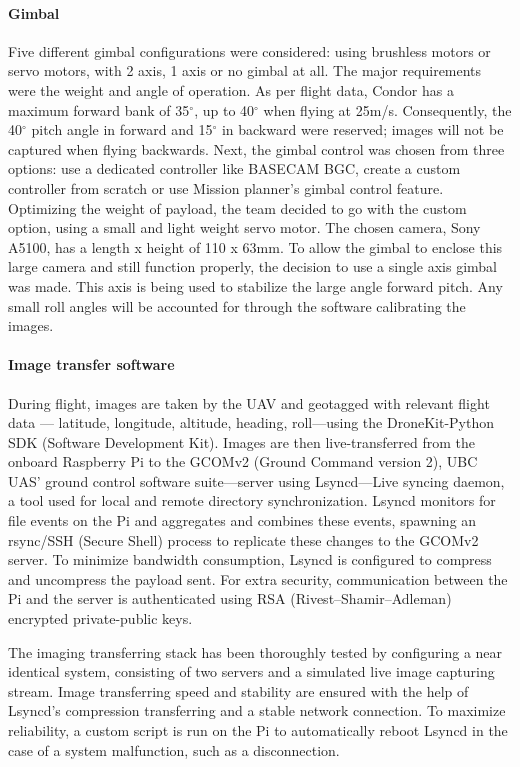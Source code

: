 \paragraph{Gimbal} 
Five different gimbal configurations were considered: using brushless motors or servo motors, with 2 axis, 1 axis or no gimbal at all. The major requirements were the weight and angle of operation. As per flight data, Condor has a maximum forward bank of 35$^{\circ}$, up to 40$^{\circ}$ when flying at 25m/s. Consequently, the 40$^{\circ}$ pitch angle in forward and 15$^{\circ}$ in backward were reserved; images will not be captured when flying backwards. Next, the gimbal control was chosen from three options: use a dedicated controller like BASECAM BGC, create a custom controller from scratch or use Mission planner's gimbal control feature. Optimizing the weight of payload, the team decided to go with the custom option, using a small and light weight servo motor. The chosen camera, Sony A5100, has a length x height of 110 x 63mm. To allow the gimbal to enclose this large camera and still function properly, the decision to use a single axis gimbal was made. This axis is being used to stabilize the large angle forward pitch. Any small roll angles will be accounted for through the software calibrating the images. 

\paragraph{Image transfer software}
During flight, images are taken by the UAV and geotagged with relevant flight data — latitude, longitude, altitude, heading, roll—using the DroneKit-Python SDK (Software Development Kit). Images are then live-transferred from the onboard Raspberry Pi to the GCOMv2 (Ground Command version 2), UBC UAS’ ground control software suite—server using Lsyncd—Live syncing daemon, a tool used for local and remote directory synchronization. Lsyncd monitors for file events on the Pi and aggregates and combines these events, spawning an rsync/SSH (Secure Shell) process to replicate these changes to the GCOMv2 server. To minimize bandwidth consumption, Lsyncd is configured to compress and uncompress the payload sent. For extra security, communication between the Pi and the server is authenticated using RSA (Rivest–Shamir–Adleman) encrypted private-public keys. 

The imaging transferring stack has been thoroughly tested by configuring a near identical system, consisting of two servers and a simulated live image capturing stream. Image transferring speed and stability are ensured with the help of Lsyncd’s compression transferring and a stable network connection. To maximize reliability, a custom script is run on the Pi to automatically reboot Lsyncd in the case of a system malfunction, such as a disconnection.
